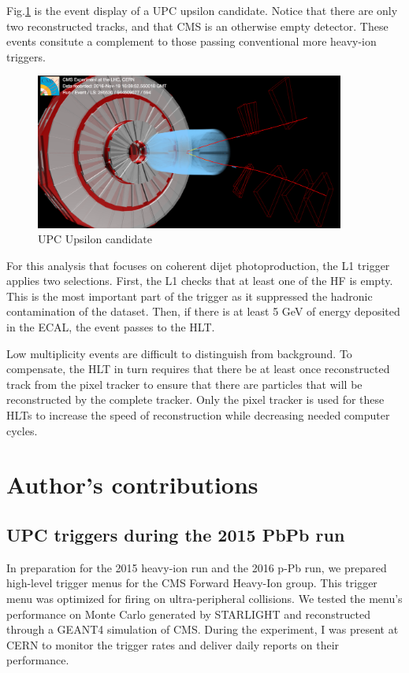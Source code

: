 Fig.\ref{fig:eventdisplayUPCUps} is the event display of a UPC upsilon candidate. Notice that there are only two reconstructed tracks, and that CMS is an otherwise empty detector. These events consitute a complement to those passing conventional more heavy-ion triggers.

\begin{figure}[h!]
\begin{centering}
\includegraphics[width=4in]{Chapter3/importfigs/upcJpsi_run285530_lumi594_event944509077_v0.png}
\par\end{centering}
\caption{UPC Upsilon candidate \label{fig:eventdisplayUPCUps}}
\end{figure}

For this analysis that focuses on coherent dijet photoproduction, the L1 trigger applies two selections. First, the L1 checks that at least one of the HF is empty. This is the most important part of the trigger as it suppressed the hadronic contamination of the dataset. Then, if there is at least 5 GeV of energy deposited in the ECAL, the event passes to the HLT. 

Low multiplicity events are difficult to distinguish from background. To compensate, the HLT in turn requires that there be at least once reconstructed track from the pixel tracker to ensure that there are particles that will be reconstructed by the complete tracker. Only the pixel tracker is used for these HLTs to increase the speed of reconstruction while decreasing needed computer cycles. 

\section{Author's contributions}

\subsection{UPC triggers during the 2015 PbPb run}
In preparation for the 2015 heavy-ion run and the 2016 p-Pb run, we prepared high-level trigger menus for the CMS Forward Heavy-Ion group. This trigger menu was optimized for firing on ultra-peripheral collisions. We tested the menu's performance on Monte Carlo generated by STARLIGHT \cite{starlight} and reconstructed through a GEANT4 \cite{Agostinelli:2002hh} simulation of CMS. During the experiment, I was present at CERN to monitor the trigger rates and deliver daily reports on their performance. 

